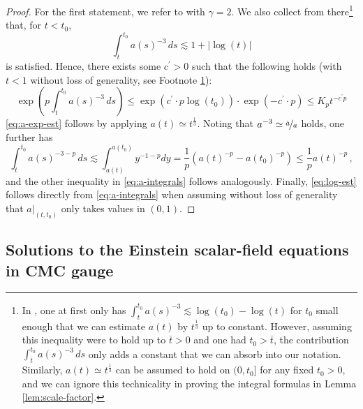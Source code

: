 \documentclass[11pt,leqno,textwidth=10cm]{amsart}
\numberwithin{equation}{section}
\theoremstyle{definition}
\theoremstyle{plain}
\newcommand{\1}{\mathbbm{1}}
\begin{document}
\begin{proof}
For the first statement, we refer to \cite[Lemma 2.1]{Urban22} with $\gamma=2$. We also collect from there\footnote{\label{fn:t0-small}In \cite[Lemma 2.1]{Urban22}, one at first only has $\int_t^{t_0}a(s)^{-3}\lesssim \log(t_0)-\log(t)$ for $t_0$ small enough that we can estimate $a(t)$ by $t^\frac13$ up to constant. However, assuming this inequality were to hold up to $\overline{t}>0$ and one had $t_0>\overline{t}$, the contribution $\int_{\overline{t}}^{t_0}a(s)^{-3}\,ds$ only adds a constant that we can absorb into our notation. Similarly, $a(t)\simeq t^\frac13$ can be assumed to hold on $(0,t_0]$ for any fixed $t_0>0$, and we can ignore this technicality in proving the integral formulas in Lemma \ref{lem:scale-factor}.} that, for $t<t_0$, 
\[\int_t^{t_0}a(s)^{-3}\,ds\lesssim 1+\lvert\log(t)\rvert\]
is satisfied. Hence, there exists some $c^\prime>0$ such that the following holds (with $t<1$ without loss of generality, see Footnote \ref{fn:t0-small}):
\[\exp\left(p\int_t^{t_0}a(s)^{-3}\,ds\right)\leq \exp(c^\prime\cdot p\log(t_0))\cdot\exp(-c^\prime\cdot p)\leq K_p t^{-c^\prime p}\]
\eqref{eq:a-exp-est} follows by applying $a(t)\simeq t^\frac13$. Noting that $a^{-3}\simeq \nicefrac{\dot{a}}a$ holds, one further has
\begin{equation}
\int_t^{t_0}a(s)^{-3-p}\,ds\lesssim\int_{a(t)}^{a(t_0)}y^{-1-p}dy=\frac1p\left(a(t)^{-p}-a(t_0)^{-p}\right)\leq\frac1p a(t)^{-p}\,,
\end{equation}
and the other inequality in \eqref{eq:a-integrals} follows analogously. Finally, \eqref{eq:log-est} follows directly from \eqref{eq:a-integrals} when assuming without loss of generality that $a\lvert_{(t,t_0)}$ only takes values in $(0,1)$.

\end{proof}


\subsection{Solutions to the Einstein scalar-field equations in CMC gauge}\label{subsec:eq}
\end{document}
